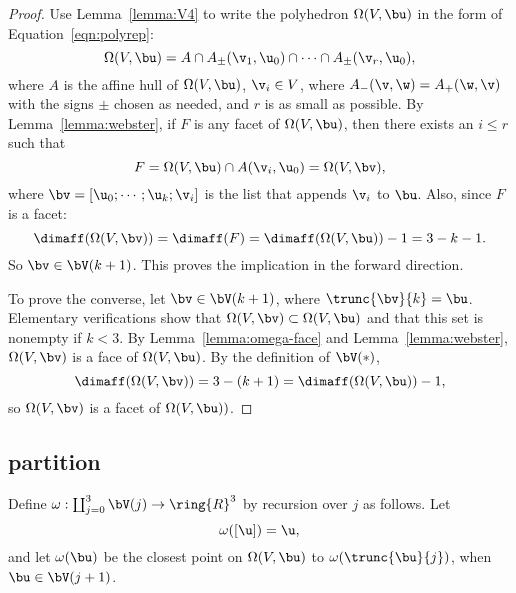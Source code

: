\begin{proof} 
  Use Lemma~\ref{lemma:V4} to write the polyhedron $\Omega(V,\bu)$ in
  the form of Equation~\ref{eqn:polyrep}:
\begin{displaymath} 
\Omega(V,\bu) = A \cap A_\pm(\v_1,\u_0) \cap \cdots\cap A_\pm(\v_r,\u_0),
\end{displaymath}
where $A$ is the affine hull of $\Omega(V,\bu)$, $\v_i\in V$, 
where $A_-(\v,\w) = A_+(\w,\v)$ with the signs $\pm$  chosen as
needed, 
and $r$ is as small as possible.
By Lemma~\ref{lemma:webster}, if $F$ is any facet of $\Omega(V,\bu)$, then there exists
an $i\le r$ such that 
\begin{displaymath} 
F = \Omega(V,\bu) \cap A(\v_i,\u_0) = \Omega(V,\bv),
\end{displaymath}
where $\bv = [\u_0;\cdots;\u_k;\v_i]$ is the list that appends $\v_i$ to $\bu$.
Also, since $F$ is a facet:
\begin{displaymath} 
\dimaff(\Omega(V,\bv)) = \dimaff(F) = \dimaff(\Omega(V,\bu)) - 1 = 3 - k - 1.
\end{displaymath}
So $\bv \in \bV(k+1)$.  This proves the implication in the forward direction.

To prove the converse, let $\bv\in \bV(k+1)$, where $\trunc{\bv}{k} =
\bu$.  Elementary verifications show that $\Omega(V,\bv)\subset
\Omega(V,\bu)$ and that this set is nonempty if $k<3$.  By
Lemma~\ref{lemma:omega-face} and Lemma~\ref{lemma:webster},
$\Omega(V,\bv)$ is a face of $\Omega(V,\bu)$.  By the definition of
$\bV(*)$,
\begin{displaymath} 
\dimaff(\Omega(V,\bv)) = 3 - (k+1) = \dimaff(\Omega(V,\bu)) -1,
\end{displaymath}
so $\Omega(V,\bv)$ is a facet of $\Omega(V,\bu))$.
\end{proof}

\subsection{partition}

\begin{definition}[$\omega$] 
Define $\omega: \coprod_{j=0}^3 \bV(j)\to \ring{R}^3$ by recursion over $j$ as follows.
Let \begin{displaymath} 
\omega([\u]) = \u,
\end{displaymath} and
let $\omega( \bu)$ be the closest point on $\Omega(V, \bu)$ to
$\omega( \trunc{\bu}{j})$, when $\bu\in \bV(j+1)$.
\end{definition}

